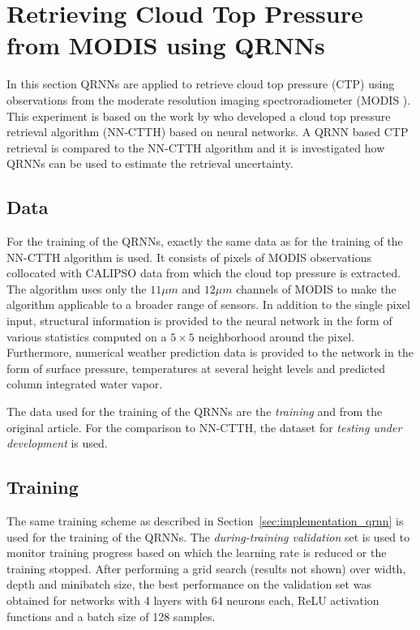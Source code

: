 \documentclass[journal abbreviation, manuscript]{copernicus}
\begin{document}
\section{Retrieving Cloud Top Pressure from MODIS using QRNNs}
\label{sec:ctp}

In this section QRNNs are applied to retrieve cloud top pressure (CTP) using
observations from the moderate resolution imaging spectroradiometer (MODIS 
\citep{modis}). This experiment is based on the work by \cite{hakansson} who
developed a cloud top pressure retrieval algorithm (NN-CTTH) based on neural
networks. A QRNN based CTP retrieval is compared to the NN-CTTH algorithm and it
is investigated how QRNNs can be used to estimate the retrieval uncertainty.

\subsection{Data}

For the training of the QRNNs, exactly the same data as for the training of the
NN-CTTH algorithm is used. It consists of pixels of MODIS observations
collocated with CALIPSO \citep{calipso} data from which the cloud top pressure
is extracted. The algorithm uses only the $11 \unit{\mu m}$ and $12\unit{\mu m}$
channels of MODIS to make the algorithm applicable to a broader range of
sensors. In addition to the single pixel input, structural information is
provided to the neural network in the form of various statistics computed on a
$5 \times 5$ neighborhood around the pixel. Furthermore, numerical weather
prediction data is provided to the network in the form of surface pressure,
temperatures at several height levels and predicted column integrated water
vapor.

The data used for the training of the QRNNs are the \textit{training} and
 from the original article. For the
comparison to NN-CTTH, the dataset for \textit{testing under development} is
used.

\subsection{Training}

The same training scheme as described in Section~\ref{sec:implementation_qrnn}
is used for the training of the QRNNs. The \textit{during-training validation} set is used
to monitor training progress based on which the learning rate is reduced or the
training stopped. After performing a grid search (results not shown) over width,
depth and minibatch size, the best performance on the validation set was
obtained for networks with 4 layers with 64 neurons each, ReLU activation functions
 and a batch size of 128 samples.
\end{document}
